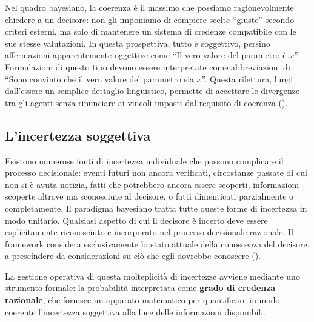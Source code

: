 \documentclass[
  letterpaper,
  DIV=11,
  numbers=noendperiod,
  oneside]{scrreprt}
\theoremstyle{definition}
\theoremstyle{plain}
\theoremstyle{definition}
\theoremstyle{remark}
\begin{document}
Nel quadro bayesiano, la coerenza è il massimo che possiamo
ragionevolmente chiedere a un decisore: non gli imponiamo di compiere
scelte ``giuste'' secondo criteri esterni, ma solo di mantenere un
sistema di credenze compatibile con le sue stesse valutazioni. In questa
prospettiva, tutto è soggettivo, persino affermazioni apparentemente
oggettive come ``Il vero valore del parametro è \(x\)''. Formulazioni di
questo tipo devono essere interpretate come abbreviazioni di ``Sono
convinto che il vero valore del parametro sia \(x\)''. Questa rilettura,
lungi dall'essere un semplice dettaglio linguistico, permette di
accettare le divergenze tra gli agenti senza rinunciare ai vincoli
imposti dal requisito di coerenza
().

\subsection{L'incertezza soggettiva}\label{lincertezza-soggettiva}

Esistono numerose fonti di incertezza individuale che possono complicare
il processo decisionale: eventi futuri non ancora verificati,
circostanze passate di cui non si è avuta notizia, fatti che potrebbero
ancora essere scoperti, informazioni scoperte altrove ma sconosciute al
decisore, o fatti dimenticati parzialmente o completamente. Il paradigma
bayesiano tratta tutte queste forme di incertezza in modo unitario.
Qualsiasi aspetto di cui il decisore è incerto deve essere
esplicitamente riconosciuto e incorporato nel processo decisionale
razionale. Il framework considera esclusivamente lo stato attuale della
conoscenza del decisore, a prescindere da considerazioni su ciò che egli
dovrebbe conoscere ().

La gestione operativa di questa molteplicità di incertezze avviene
mediante uno strumento formale: la probabilità interpretata come
\textbf{grado di credenza razionale}, che fornisce un apparato
matematico per quantificare in modo coerente l'incertezza soggettiva
alla luce delle informazioni disponibili.
\end{document}

